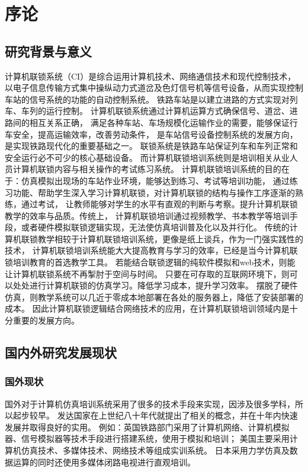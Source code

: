 \section{序论}
\subsection{研究背景与意义}
计算机联锁系统（CI）是综合运用计算机技术、网络通信技术和现代控制技术，
以电子信息传输方式集中操纵动力式道岔及色灯信号机等信号设备，从而实现控制车站的信号系统的功能的自动控制系统。
铁路车站是以建立进路的方式实现对列车、车列的运行控制。
计算机联锁系统通过计算机运算方式确保信号、道岔、进路间的相互关系正确，
满足各种车站、车场规模化运输作业的需要，能够保证行车安全，提高运输效率，改善劳动条件，
是车站信号设备控制系统的发展方向，是实现铁路现代化的重要基础之一。
联锁系统是铁路车站保证列车和车列正常和安全运行必不可少的核心基础设备。
而计算机联锁培训系统则是培训相关从业人员计算机联锁内容与相关操作的考试练习系统。
计算机联锁培训系统的目的在于：仿真模拟出现场的车站作业环境，能够达到练习、考试等培训功能，
通过练习功能、帮助学生深入学习计算机联锁，对计算机联锁的结构与操作工序逐渐的熟练，通过考试，
让教师能够对学生的水平有直观的判断与考察。提升计算机联锁教学的效率与品质。传统上，
计算机联锁培训通过视频教学、书本教学等培训手段，或者硬件模拟联锁逻辑实现，无法使仿真培训普及化以及并行化。
传统的计算机联锁教学相较于计算机联锁培训系统，更像是纸上谈兵，作为一门强实践性的技术，
计算机联锁培训系统能大大提高教育与学习的效率，已经是当今计算机联锁培训教育的首选教学工具\cite{intercnki}。
若能结合联锁逻辑的纯软件模拟和web技术，则能让计算机联锁系统不再掣肘于空间与时间。
只要在可存取的互联网环境下，则可以处处进行计算机联锁的仿真学习。降低学习成本，提升学习效率。
摆脱了硬件仿真，则教学系统可以几近于零成本地部署在各处的服务器上，降低了安装部署的成本。
因此计算机联锁逻辑结合网络技术的应用，在计算机联锁培训领域内是十分重要的发展方向。

\subsection{国内外研究发展现状}
\subsubsection{国外现状}
国外对于计算机仿真培训系统采用了很多的技术手段来实现，因涉及很多学科，所以起步较早。
发达国家在上世纪八十年代就提出了相关的概念，并在十年内快速发展并取得良好的实用。
例如：英国铁路部门采用了计算机网络、计算机模拟器、信号模拟器等技术手段进行搭建系统，使用于模拟和培训；
美国主要采用计算机仿真技术、多媒体技术、网络技术等组成实训系统。
日本采用力学仿真及数据运算的同时还使用多媒体闭路电视进行直观培训。\cite{intercnki}

